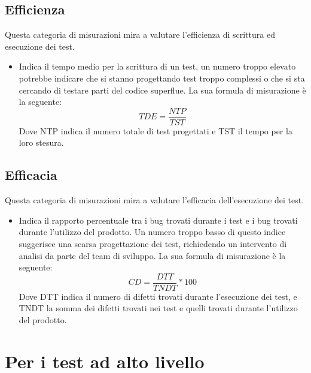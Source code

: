 \documentclass[PianoDiProgetto.tex]{subfiles}
\begin{document}
\subsection{Efficienza}
Questa categoria di misurazioni mira a valutare l'efficienza di scrittura ed esecuzione dei test.
\begin{itemize}
	\item {} Indica il tempo medio per la scrittura di un test, un numero troppo elevato potrebbe indicare che si stanno progettando test troppo complessi o che si sta cercando di testare parti del codice superflue. La sua formula di misurazione è la seguente:
	\[TDE=\dfrac{NTP}{TST}\]
	Dove NTP indica il numero totale di test progettati e TST il tempo per la loro stesura.
	\begin{comment}
	\item \textlink{MTSA005TAB}{MTSA005}{\textbf{MTSA005 Tempo medio per il testing dei bug fix:}} Indica la quantità di tempo medio per testare la risoluzione di un difetto, utile per avere un'idea dell'impatto del testing sull'implementazione di una modifica
	\[TTCD=\dfrac{BFTT}{NDT}\]
	Dove BFTT indica il tempo usato per testare le la correzione dei difetti e NDT il numero di difetti trovati.
	\end{comment}
\end{itemize}
\subsection{Efficacia}
Questa categoria di misurazioni mira a valutare l'efficacia dell'esecuzione dei test.
\begin{itemize}
	\item {} Indica il rapporto percentuale tra i bug trovati durante i test e i bug trovati durante l'utilizzo del prodotto. Un numero troppo basso di questo indice suggerisce una scarsa progettazione dei test, richiedendo un intervento di analisi da parte del team di sviluppo. La sua formula di misurazione è la seguente:
	\[CD=\dfrac{DTT}{TNDT}*100\]
	Dove DTT indica il numero di difetti trovati durante l'esecuzione dei test, e TNDT la somma dei difetti trovati nei test e quelli trovati durante l'utilizzo del prodotto.
\end{itemize}
\section{Per i test ad alto livello}
\end{document}
